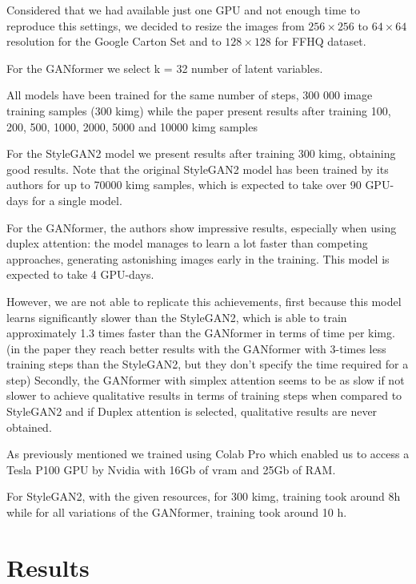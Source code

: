 \documentclass{article}
\begin{document}
Considered that we had available just one GPU and not enough time to reproduce this settings, we 
decided to resize the images from $256\times 256$ to $64\times64$ resolution for the Google Carton Set and to $128 \times 128$ for FFHQ dataset.


For the GANformer we select k = 32 number of latent variables. 

All models have been trained for the same number of steps, 300 000 image
training samples (300 kimg) while the paper present results after training 100, 200, 500, 1000, 2000, 
5000 and 10000 kimg samples

For the StyleGAN2 model we present results after training 300 kimg, obtaining 
good results.
Note that the original StyleGAN2 model has been trained by its authors \cite{karras2020analyzing} 
for up to 70000 kimg samples, which is expected to take over 90 GPU-days for a single model. 


For the GANformer, the authors \cite{karras2020analyzing} show impressive results, especially when 
using duplex attention: the model manages to learn a lot faster than competing approaches, 
generating astonishing images early in the training. This model is expected to take 4 GPU-days.

However, we are not able to replicate this achievements, first because this model learns significantly 
slower than the StyleGAN2, which is able to train approximately 
1.3 times faster than the GANformer in terms of time per kimg.
(in the paper they reach better results with the GANformer with 3-times less training steps than the 
StyleGAN2, but they don't specify the time required for a step)
Secondly, the GANformer with simplex attention seems to be as slow if not slower to achieve 
qualitative results
in terms of training steps when compared to StyleGAN2 and if Duplex attention is selected, 
qualitative results are never obtained.

As previously mentioned we trained using Colab Pro which enabled us to access a Tesla P100 GPU 
by Nvidia with 16Gb of vram 
and 25Gb of RAM.

For StyleGAN2, with the given resources, for 300 kimg, training took around 8h while for all 
variations of the GANformer, training took around 10 h.


\section{Results}\label{sec:results}
\end{document}
